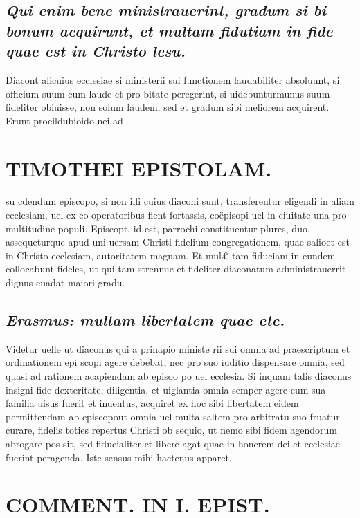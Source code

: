\documentclass{article}
\begin{document}
\begin{pages}
\subsection*{\textit{Qui enim bene ministrauerint, gradum si bi bonum acquirunt, et multam fidutiam in fide quae est in Christo lesu. }}\pstart Diacont alicuius ecclesiae si ministerii sui functionem laudabiliter absoluunt, si officium suum cum laude et pro bitate peregerint, si uidebunturmunus suum fideliter obiuisse, non solum laudem, sed et gradum sibi meliorem acquirent. Erunt procildubioido nei ad  \pend
\section*{TIMOTHEI EPISTOLAM. }
\marginpar{[ p.87 ]}\pstart su cdendum episcopo, si non illi cuius diaconi sunt, transferentur eligendi in aliam ecclesiam, uel ex co operatoribus fient fortassis, coëpisopi uel in ciuitate una pro multitudine populi. Episcopt, id est, parrochi constituentur plures, duo, assequeturque apud uni uersam Christi fidelium congregationem, quae salioet est in Christo ecclesiam, autoritatem magnam. Et mul£ tam fiduciam in eundem collocabunt fideles, ut qui tam strennue et fideliter diaconatum administrauerrit dignus euadat maiori gradu.  \pend
{}
{}
\subsection*{\textit{Erasmus: multam libertatem quae etc. }}\pstart Videtur uelle ut diaconus qui a prinapio ministe rii sui omnia ad praescriptum et ordinationem epi scopi agere debebat, nec pro suo iuditio dispensare omnia, sed quasi ad rationem acapiendam ab episoo po uel ecclesia. Si inquam talis diaconus insigni fide dexteritate, diligentia, et uiglantia omnia semper agere cum sua familia uisus fuerit et inuentus, acquiret ex hoc sibi libertatem eidem permittendam ab episcopout omnia uel multa saltem pro arbitratu suo fruatur curare, fidelis toties repertus Christi ob sequio, ut nemo sibi fidem agendorum abrogare pos sit, sed fiducialiter et libere agat quae in honcrem dei et ecclesiae fuerint peragenda. Iste sensus mihi hactenus apparet.  \pend
\section*{COMMENT. IN I. EPIST. }
\marginpar{[ p.88 ]}
{}

\end{pages}
\end{document}

